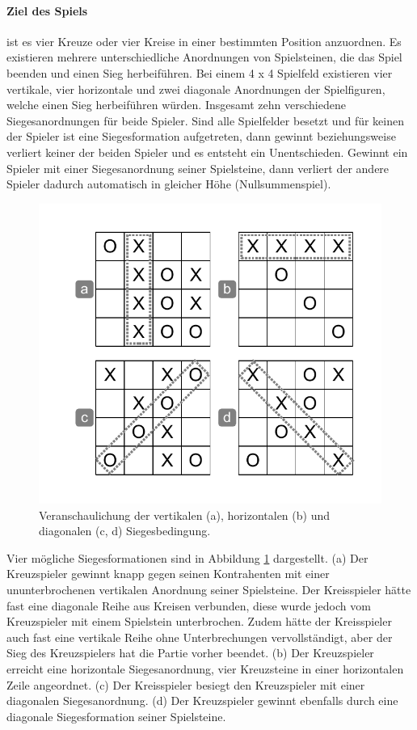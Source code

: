 \paragraph{Ziel des Spiels} ist es vier Kreuze oder vier Kreise in einer bestimmten Position anzuordnen. Es existieren mehrere unterschiedliche Anordnungen von Spielsteinen, die das Spiel beenden und einen Sieg herbeiführen. Bei einem 4 x 4 Spielfeld existieren vier vertikale, vier horizontale und zwei diagonale Anordnungen der Spielfiguren, welche einen Sieg herbeiführen würden. Insgesamt zehn verschiedene Siegesanordnungen für beide Spieler. Sind alle Spielfelder besetzt und für keinen der Spieler ist eine Siegesformation aufgetreten, dann gewinnt beziehungsweise verliert keiner der beiden Spieler und es entsteht ein Unentschieden. Gewinnt ein Spieler mit einer Siegesanordnung seiner Spielsteine, dann verliert der andere Spieler dadurch automatisch in gleicher Höhe (Nullsummenspiel). \\

\begin{figure}[!htbp]
  \centering
  \includegraphics[scale = 1]{inhalt/abbildungen/siegesbedingungen_tictactoe.pdf}
  \caption{Veranschaulichung der vertikalen (a), horizontalen (b) und diagonalen (c, d) Siegesbedingung.}
  \label{fig:siegesbedingungen_tictactoe}
\end{figure}

Vier mögliche Siegesformationen sind in Abbildung \ref{fig:siegesbedingungen_tictactoe} dargestellt. (a) Der Kreuzspieler gewinnt knapp gegen seinen Kontrahenten mit einer ununterbrochenen vertikalen Anordnung seiner Spielsteine. Der Kreisspieler hätte fast eine diagonale Reihe aus Kreisen verbunden, diese wurde jedoch vom Kreuzspieler mit einem Spielstein unterbrochen. Zudem hätte der Kreisspieler auch fast eine vertikale Reihe ohne Unterbrechungen vervollständigt, aber der Sieg des Kreuzspielers hat die Partie vorher beendet. (b) Der Kreuzspieler erreicht eine horizontale Siegesanordnung, vier Kreuzsteine in einer horizontalen Zeile angeordnet. (c) Der Kreisspieler besiegt den Kreuzspieler mit einer diagonalen Siegesanordnung. (d) Der Kreuzspieler gewinnt ebenfalls durch eine diagonale Siegesformation seiner Spielsteine. 



